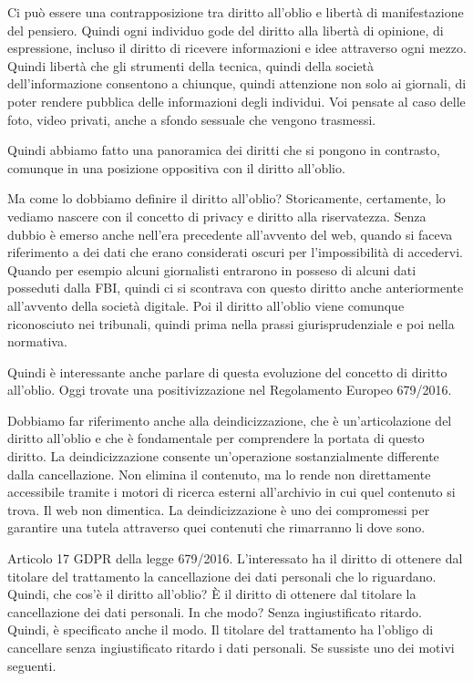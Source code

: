 Ci può essere una contrapposizione tra diritto all'oblio e libertà di manifestazione del pensiero.
Quindi ogni individuo gode del diritto alla libertà di opinione, di espressione, incluso il diritto di ricevere informazioni e idee attraverso ogni mezzo.
Quindi libertà che gli strumenti della tecnica, quindi della società dell'informazione consentono a chiunque, quindi attenzione non solo ai giornali, di poter rendere pubblica delle informazioni degli individui.
Voi pensate al caso delle foto, video privati, anche a sfondo sessuale che vengono trasmessi.

Quindi abbiamo fatto una panoramica dei diritti che si pongono in contrasto, comunque in una posizione oppositiva con il diritto all'oblio.

Ma come lo dobbiamo definire il diritto all'oblio?
Storicamente, certamente, lo vediamo nascere con il concetto di privacy e diritto alla riservatezza.
Senza dubbio è emerso anche nell'era precedente all'avvento del web, quando si faceva riferimento a dei dati che erano considerati oscuri per l'impossibilità di accedervi.
Quando per esempio alcuni giornalisti entrarono in posseso di alcuni dati posseduti dalla FBI, quindi ci si scontrava con questo diritto anche anteriormente all'avvento della società digitale.
Poi il diritto all'oblio viene comunque riconosciuto nei tribunali, quindi prima nella prassi giurisprudenziale e poi nella normativa.

Quindi è interessante anche parlare di questa evoluzione del concetto di diritto all'oblio.
Oggi trovate una positivizzazione nel Regolamento Europeo 679/2016.

Dobbiamo far riferimento anche alla deindicizzazione, che è un'articolazione del diritto all'oblio e che è fondamentale per comprendere la portata di questo diritto.
La deindicizzazione consente un'operazione sostanzialmente differente dalla cancellazione.
Non elimina il contenuto, ma lo rende non direttamente accessibile tramite i motori di ricerca esterni all'archivio in cui quel contenuto si trova. Il web non dimentica.
La deindicizzazione è uno dei compromessi per garantire una tutela attraverso quei contenuti che rimarranno li dove sono.

Articolo 17 GDPR della legge 679/2016.
L'interessato ha il diritto di ottenere dal titolare del trattamento la cancellazione dei dati personali che lo riguardano.
Quindi, che cos'è il diritto all'oblio?
È il diritto di ottenere dal titolare la cancellazione dei dati personali.
In che modo?
Senza ingiustificato ritardo. Quindi, è specificato anche il modo.
Il titolare del trattamento ha l'obligo di cancellare senza ingiustificato ritardo i dati personali.
Se sussiste uno dei motivi seguenti.

